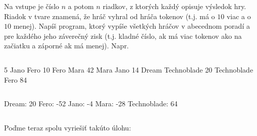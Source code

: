 \begin{uloha}
  Na vstupe je číslo $n$ a potom $n$ riadkov, z ktorých každý opisuje výsledok hry.
  Riadok v tvare  znamená, že hráč  vyhral od hráča 
   tokenov (t.j.  má o $10$ viac a  o $10$ menej).
  Napíš program, ktorý vypíše všetkých hráčov v abecednom poradí a pre každého jeho
  záverečný zisk (t.j. kladné číslo, ak má viac tokenov ako na začiatku a záporné
  ak má menej). Napr.


\begin{column}{0.45}
\begin{outputBox}
5
Jano Fero 10
Fero Mara 42
Mara Jano 14
Dream Technoblade 20
Technoblade Fero 84
\end{outputBox}
\end{column}\hfill\begin{column}{0.45}
\begin{outputBox}
Dream: 20
Fero: -52
Jano: -4
Mara: -28
Technoblade: 64
\end{outputBox}
\end{column}
\end{uloha}


Poďme teraz spolu vyriešiť takúto úlohu:

